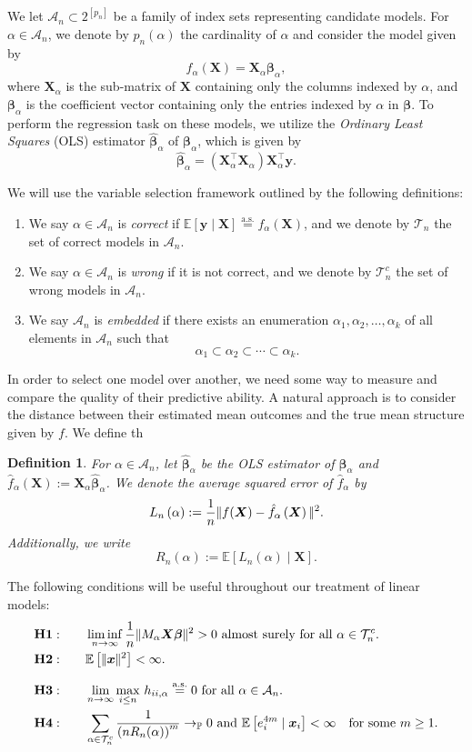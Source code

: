 \documentclass[12pt, letter paper]{article}
\newcommand{\1}{\mathmybb{1}}
\newtheorem{definition}{Definition}[section]
\newcommand{\0}{\emptyset}
\newcommand{\prob}{\mathbb{P}}
\newcommand{\Ep}[1]{\mathbb{E}\left[ #1 \right]}
\newcommand{\paren}[1]{\left(#1 \right)}
\newcommand{\norm}[1]{|\hspace{-1pt}|#1 |\hspace{-1pt}|}
\newcommand{\normsq}[1]{\norm{#1}^{2}}
\newcommand{\Acal}{\mathcal{A}_{n}}
\newcommand{\Tcal}{\mathcal{T}_{n}}
\newcommand{\aseq}{\stackrel{\mathrm{a.s.}}{=}}
\newcommand{\X}{\boldsymbol{X}}
\newcommand{\x}{\boldsymbol{x}}
\newcommand{\y}{\boldsymbol{y}}
\newcommand{\bbeta}{\boldsymbol{\beta}}
\newcommand{\bbetahat}{\boldsymbol{\hat{\beta}}}
\newcommand{\Loss}[1]{L_{n}\paren{#1}}
\newcommand{\ols}[1]{\paren{\X^{\top}_{#1}\X_{#1}}\X^{\top}_{#1}\y}
\begin{document}
We let \(\Acal\subset2^{[p_{n}]}\) be a family of index sets representing candidate models. For \(\alpha\in\Acal\), we denote by \(p_{n}(\alpha)\) the cardinality of \(\alpha\) and consider the model given by
\[f_{\alpha}(\X) = \X_{\alpha}\bbeta_{\alpha},\]
where \(\X_{\alpha}\) is the sub-matrix of \(\X\) containing only the columns indexed by \(\alpha\), and \(\bbeta_{\alpha}\) is the coefficient vector containing only the entries indexed by \(\alpha\) in \(\bbeta\). To perform the regression task on these models, we utilize the \emph{Ordinary Least Squares} (OLS) estimator \(\bbetahat_{\alpha}\) of \(\bbeta_{\alpha}\), which is given by
\[\bbetahat_{\alpha} = \ols{\alpha}.\]

We will use the variable selection framework outlined by the following definitions:

\begin{enumerate}
    \item We say \(\alpha\in\Acal\) is \emph{correct} if \(\Ep{\y\mid\X}\aseq f_{\alpha}(\X)\), and we denote by \(\Tcal\) the set of correct models in \(\Acal\).
    \item We say \(\alpha\in\Acal\) is \emph{wrong} if it is not correct, and we denote by \(\Tcal^{c}\) the set of wrong models in \(\Acal\).
    \item We say \(\Acal\) is \emph{embedded} if there exists an enumeration \(\alpha_{1}, \alpha_{2}, \ldots, \alpha_{k}\) of all elements in \(\Acal\) such that \[\alpha_{1}\subset\alpha_{2}\subset\cdots\subset\alpha_{k}.\]
\end{enumerate}

In order to select one model over another, we need some way to measure and compare the quality of their predictive ability. A natural approach is to consider the distance between their estimated mean outcomes and the true mean structure given by \(f\). We define th

\begin{definition}\label{def:loss}
    For \(\alpha\in\Acal\), let \(\bbetahat_{\alpha}\) be the OLS estimator of \(\bbeta_{\alpha}\) and \(\hat{f}_{\alpha}(\X):=\X_{\alpha}\bbetahat_{\alpha}\). We denote the average squared error of \(\hat{f}_{\alpha}\) by
    \[\Loss{\alpha}:=\frac{1}{n}\normsq{f(\X) - \hat{f}_{\alpha}\paren{\X}}.\]
    Additionally, we write
    \[R_{n}(\alpha):= \Ep{\Loss{\alpha}\mid\X}.\]
\end{definition}

The following conditions will be useful throughout our treatment of linear models:
\begin{align*}
    &\mathbf{H1:}\qquad \liminf_{n\to\infty} \frac{1}{n}\normsq{M_{\alpha}\X\bbeta}>0 \text{ almost surely for all }\alpha \in\Tcal^{c}.\\
    &\mathbf{H2:} \qquad \Ep{\normsq{\x}}<\infty.\\[2.5mm]
    &\mathbf{H3:}\qquad \lim_{n\to\infty}\max_{i\leq n}\,h_{ii,\alpha} \aseq 0 \text{ for all }\alpha \in\Acal.\\
    &\mathbf{H4:}\qquad \sum_{\alpha\in\Tcal^{c}}\frac{1}{\paren{nR_{n}(\alpha)}^{m}}\to_{\prob}0\text{ and }\Ep{e_i^{4m}\mid\x_i}<\infty\quad\text{for some }m\geq 1.
\end{align*}
\end{document}
